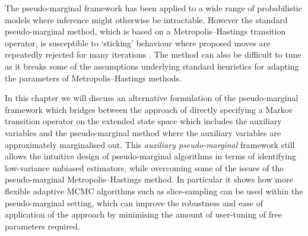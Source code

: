 The pseudo-marginal framework has been applied to a wide range of probabilistic models where inference might otherwise be intractable. However the standard pseudo-marginal method, which is based on a Metro\-polis--Hastings transition operator, is susceptible to `sticking' behaviour where proposed moves are repeatedly rejected for many iterations \citep{andrieu2009pseudo,sherlock2015efficiency}. The method can also be difficult to tune as it breaks some of the assumptions underlying standard heuristics for adapting the parameters of Metropolis--Hastings methods.




In this chapter we will discuss an alternative formulation of the pseudo-marginal framework which bridges between the approach of directly specifying a Markov transition operator on the extended state space which includes the auxiliary variables and the pseudo-marginal method where the auxiliary variables are approximately marginalised out. This \emph{auxiliary pseudo-marginal} framework still allows the intuitive design of pseudo-marginal algorithms in terms of identifying low-variance unbiased estimators, while overcoming some of the issues of the pseudo-marginal Metropolis--Hastings method. In particular it shows how more flexible adaptive \ac{MCMC} algorithms such as slice-sampling can be used within the pseudo-marginal setting, which can improve the robustness and ease of application of the approach by minimising the amount of user-tuning of free parameters required.

